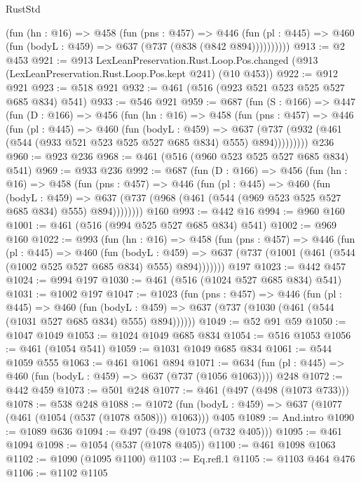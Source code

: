 \begin{lexlean}{RustStd}
\begin{coremodule}
          (fun (hn : @16) =>
          @458
            (fun (pns : @457) =>
            @446
              (fun (pl : @445) => @460 (fun (bodyL : @459) => @637 (@737 (@838 (@842 @894))))))))))
@913 := @2 @453
@921 := @913
    LexLeanPreservation.Rust.Loop.Pos.changed
    (@913 (LexLeanPreservation.Rust.Loop.Pos.kept @241) (@10 @453))
@922 := @912 @921
@923 := @518 @921
@932 := @461 (@516 (@923 @521 @523 @525 @527 @685 @834) @541)
@933 := @546 @921
@959 := @687
    (fun (S : @166) =>
    @447
      (fun (D : @166) =>
      @456
        (fun (hn : @16) =>
        @458
          (fun (pns : @457) =>
          @446
            (fun (pl : @445) =>
            @460
              (fun (bodyL : @459) =>
              @637 (@737 (@932 (@461 (@544 (@933 @521 @523 @525 @527 @685 @834) @555) @894)))))))))
    @236
@960 := @923 @236
@968 := @461 (@516 (@960 @523 @525 @527 @685 @834) @541)
@969 := @933 @236
@992 := @687
    (fun (D : @166) =>
    @456
      (fun (hn : @16) =>
      @458
        (fun (pns : @457) =>
        @446
          (fun (pl : @445) =>
          @460
            (fun (bodyL : @459) =>
            @637 (@737 (@968 (@461 (@544 (@969 @523 @525 @527 @685 @834) @555) @894))))))))
    @160
@993 := @442 @16
@994 := @960 @160
@1001 := @461 (@516 (@994 @525 @527 @685 @834) @541)
@1002 := @969 @160
@1022 := @993
    (fun (hn : @16) =>
    @458
      (fun (pns : @457) =>
      @446
        (fun (pl : @445) =>
        @460
          (fun (bodyL : @459) =>
          @637 (@737 (@1001 (@461 (@544 (@1002 @525 @527 @685 @834) @555) @894)))))))
    @197
@1023 := @442 @457
@1024 := @994 @197
@1030 := @461 (@516 (@1024 @527 @685 @834) @541)
@1031 := @1002 @197
@1047 := @1023
    (fun (pns : @457) =>
    @446
      (fun (pl : @445) =>
      @460
        (fun (bodyL : @459) => @637 (@737 (@1030 (@461 (@544 (@1031 @527 @685 @834) @555) @894))))))
@1049 := @52 @91 @59
@1050 := @1047 @1049
@1053 := @1024 @1049 @685 @834
@1054 := @516 @1053
@1056 := @461 (@1054 @541)
@1059 := @1031 @1049 @685 @834
@1061 := @544 @1059 @555
@1063 := @461 @1061 @894
@1071 := @634 (fun (pl : @445) => @460 (fun (bodyL : @459) => @637 (@737 (@1056 @1063)))) @248
@1072 := @442 @459
@1073 := @501 @248
@1077 := @461 (@497 (@498 (@1073 @733)))
@1078 := @538 @248
@1088 := @1072 (fun (bodyL : @459) => @637 (@1077 (@461 (@1054 (@537 (@1078 @508))) @1063))) @405
@1089 := And.intro
@1090 := @1089 @636
@1094 := @497 (@498 (@1073 (@732 @405)))
@1095 := @461 @1094
@1098 := @1054 (@537 (@1078 @405))
@1100 := @461 @1098 @1063
@1102 := @1090 (@1095 @1100)
@1103 := Eq.refl.{1}
@1105 := @1103 @464 @476
@1106 := @1102 @1105

\end{coremodule}
\end{lexlean}
